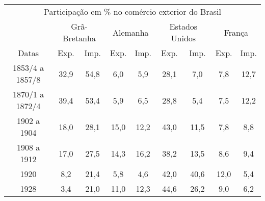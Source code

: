 \begin{table}[!htp]
\centering
{}
{\begin{tabular}{|ccccccccc|}
\hline
\multicolumn{9}{|c|}{Participação em \% no comércio exterior do Brasil} \\
 & \multicolumn{2}{c}{Grã-Bretanha} & \multicolumn{2}{c}{Alemanha} & \multicolumn{2}{c}{Estados Unidos} & \multicolumn{2}{c|}{França} \\
 Datas & Exp. & Imp. & Exp. & Imp. & Exp. & Imp. & Exp. & Imp. \\
\hline
1853/4 a 1857/8 & 32,9 & 54,8 & 6,0 & 5,9 & 28,1 & 7,0 & 7,8 & 12,7 \\
1870/1 a 1872/4 & 39,4 & 53,4 & 5,9 & 6,5 & 28,8 & 5,4 & 7,5 & 12,2 \\
1902 a 1904 & 18,0 & 28,1 & 15,0 & 12,2 & 43,0 & 11,5 & 7,8 & 8,8 \\
1908 a 1912 & 17,0 & 27,5 & 14,3 & 16,2 & 38,2 & 13,5 & 8,6 & 9,4 \\
1920 & 8,2 & 21,4 & 5,8 & 4,6 & 42,0 & 40,6 & 12,0 & 5,4 \\
1928 & 3,4 & 21,0 & 11,0 & 12,3 & 44,6 & 26,2 & 9,0 & 6,2 \\
\hline
\end{tabular} }
{  }
\end{table}